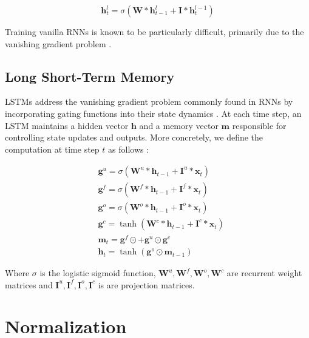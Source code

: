 \documentclass{article}
\def\x{{\mathbf x}}
\begin{document}
\begin{equation}
	\boldsymbol h_t^{l} = \sigma(\boldsymbol W * \boldsymbol h_{t-1}^{l} + \boldsymbol I * \boldsymbol h_t^{l-1}) \nonumber
\end{equation}

Training vanilla RNNs is known to be particularly difficult, primarily due to the vanishing gradient problem \cite{pascanu2012difficulty}.

\subsection{Long Short-Term Memory}
LSTMs address the vanishing gradient problem commonly found in RNNs by incorporating gating functions into their state dynamics \citep{hochreiter1997long}. At each time step, an LSTM maintains a hidden vector $\boldsymbol h$ and a memory vector $\boldsymbol m$  responsible for controlling state updates and outputs. More concretely, we define the computation at time step $t$ as follows \cite{kalchbrenner2015grid}:

\begin{equation}
	\begin{split}
		& \boldsymbol g^u = \sigma(\boldsymbol W^u * \boldsymbol h_{t-1} + \boldsymbol I^u * \x_t) \\
		& \boldsymbol g^f = \sigma(\boldsymbol W^f * \boldsymbol h_{t-1} + \boldsymbol I^f * \x_t) \\
		& \boldsymbol g^o = \sigma(\boldsymbol W^o * \boldsymbol h_{t-1} + \boldsymbol I^o * \x_t) \\
		& \boldsymbol g^c = \tanh(\boldsymbol W^c * \boldsymbol h_{t-1} + \boldsymbol I^c * \x_t) \\
		& \boldsymbol m_t = \boldsymbol g^f \odot \boldsymbol +  \boldsymbol g^u \odot \boldsymbol g^c \\
		& \boldsymbol h_t = \tanh(\boldsymbol g^o \odot \boldsymbol m_{t-1}) \nonumber
	\end{split}
\end{equation}

Where $\sigma$ is the logistic sigmoid function, $\boldsymbol W^u, \boldsymbol W^f, \boldsymbol W^o, \boldsymbol W^c$ are recurrent weight matrices and $\boldsymbol I^u, \boldsymbol I^f, \boldsymbol I^o, \boldsymbol I^c$ is are projection matrices.

\section{Normalization}
\end{document}
